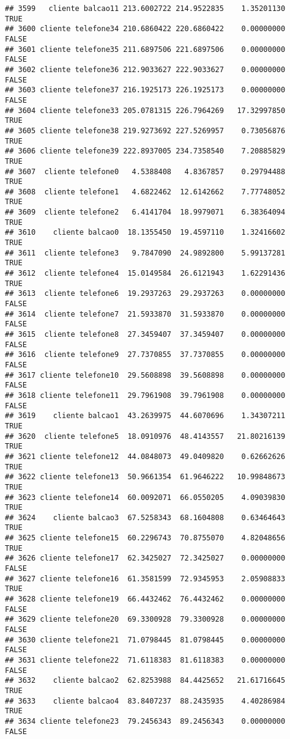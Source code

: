 \documentclass[
]{article}
\begin{document}
\begin{verbatim}
## 3599   cliente balcao11 213.6002722 214.9522835    1.35201130     TRUE
## 3600 cliente telefone34 210.6860422 220.6860422    0.00000000    FALSE
## 3601 cliente telefone35 211.6897506 221.6897506    0.00000000    FALSE
## 3602 cliente telefone36 212.9033627 222.9033627    0.00000000    FALSE
## 3603 cliente telefone37 216.1925173 226.1925173    0.00000000    FALSE
## 3604 cliente telefone33 205.0781315 226.7964269   17.32997850     TRUE
## 3605 cliente telefone38 219.9273692 227.5269957    0.73056876     TRUE
## 3606 cliente telefone39 222.8937005 234.7358540    7.20885829     TRUE
## 3607  cliente telefone0   4.5388408   4.8367857    0.29794488     TRUE
## 3608  cliente telefone1   4.6822462  12.6142662    7.77748052     TRUE
## 3609  cliente telefone2   6.4141704  18.9979071    6.38364094     TRUE
## 3610    cliente balcao0  18.1355450  19.4597110    1.32416602     TRUE
## 3611  cliente telefone3   9.7847090  24.9892800    5.99137281     TRUE
## 3612  cliente telefone4  15.0149584  26.6121943    1.62291436     TRUE
## 3613  cliente telefone6  19.2937263  29.2937263    0.00000000    FALSE
## 3614  cliente telefone7  21.5933870  31.5933870    0.00000000    FALSE
## 3615  cliente telefone8  27.3459407  37.3459407    0.00000000    FALSE
## 3616  cliente telefone9  27.7370855  37.7370855    0.00000000    FALSE
## 3617 cliente telefone10  29.5608898  39.5608898    0.00000000    FALSE
## 3618 cliente telefone11  29.7961908  39.7961908    0.00000000    FALSE
## 3619    cliente balcao1  43.2639975  44.6070696    1.34307211     TRUE
## 3620  cliente telefone5  18.0910976  48.4143557   21.80216139     TRUE
## 3621 cliente telefone12  44.0848073  49.0409820    0.62662626     TRUE
## 3622 cliente telefone13  50.9661354  61.9646222   10.99848673     TRUE
## 3623 cliente telefone14  60.0092071  66.0550205    4.09039830     TRUE
## 3624    cliente balcao3  67.5258343  68.1604808    0.63464643     TRUE
## 3625 cliente telefone15  60.2296743  70.8755070    4.82048656     TRUE
## 3626 cliente telefone17  62.3425027  72.3425027    0.00000000    FALSE
## 3627 cliente telefone16  61.3581599  72.9345953    2.05908833     TRUE
## 3628 cliente telefone19  66.4432462  76.4432462    0.00000000    FALSE
## 3629 cliente telefone20  69.3300928  79.3300928    0.00000000    FALSE
## 3630 cliente telefone21  71.0798445  81.0798445    0.00000000    FALSE
## 3631 cliente telefone22  71.6118383  81.6118383    0.00000000    FALSE
## 3632    cliente balcao2  62.8253988  84.4425652   21.61716645     TRUE
## 3633    cliente balcao4  83.8407237  88.2435935    4.40286984     TRUE
## 3634 cliente telefone23  79.2456343  89.2456343    0.00000000    FALSE

\end{verbatim}
\end{document}
